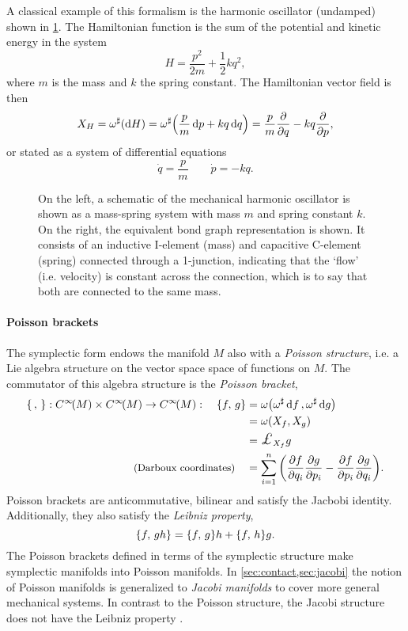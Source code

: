 A classical example of this formalism is the harmonic oscillator (undamped) shown in \cref{fig:ho}. The Hamiltonian function is the sum of the potential and kinetic energy in the system
$$ H = \frac{p^2}{2m} + \frac{1}{2}kq^2,$$
where $m$ is the mass and $k$ the spring constant. The Hamiltonian vector field is then 
$$ X_H = \omega^\sharp\qty(\dd{H}) = \omega^\sharp\qty(\frac{p}{m}\dd{p} + kq\dd{q}) = \frac{p}{m}\pdv{}{q} - kq \pdv{}{p}, $$
or stated as a system of differential equations
$$ \dot{q} = \frac{p}{m} \qquad \dot{p} = -kq. $$
\begin{figure}[ht]
    \centering
    
    \caption{On the left, a schematic of the mechanical harmonic oscillator is shown as a mass-spring system with mass $m$ and spring constant $k$. On the right, the equivalent bond graph representation is shown. It consists of an inductive I-element (mass) and capacitive C-element (spring) connected through a 1-junction, indicating that the `flow' (i.e. velocity) is constant across the connection, which is to say that both are connected to the same mass.}
    \label{fig:ho}
\end{figure}

\paragraph{Poisson brackets} The symplectic form endows the manifold $M$ also with a \emph{Poisson structure}, i.e. a Lie algebra structure on the vector space space of functions on $M$. The commutator of this algebra structure is the \emph{Poisson bracket},
\begin{equation}
    \begin{split}
        \poisson{\,}{}: \functions{M} \times \functions{M} \to \functions{M}: \quad  
        \poisson{f}{g} &= \omega\qty(\fromDual{\omega}\dd{f}, \fromDual{\omega}\dd{g})  \\
                       &= \omega\qty(X_f, X_g) \\
                       &= \lied{X_f}{g} \\
        \text{\small (Darboux coordinates)} \quad &= \sum_{i = 1}^n \qty(\pdv{f}{q_i}\pdv{g}{p_i} - \pdv{f}{p_i}\pdv{g}{q_i}).
    \end{split}
\end{equation}
Poisson brackets are anticommutative, bilinear and satisfy the Jacbobi identity. Additionally, they also satisfy the \emph{Leibniz property}, 
$$ 
    \qty{f,\,gh} = \qty{f,\,g} h + \qty{f,\,h} g. 
$$
The Poisson brackets defined in terms of the symplectic structure make symplectic manifolds into Poisson manifolds. In \cref{sec:contact,sec:jacobi} the notion of Poisson manifolds is generalized to \emph{Jacobi manifolds} to cover more general mechanical systems. In contrast to the Poisson structure, the Jacobi structure does not have the Leibniz property \cite{Arnold1989,Libermann1987}.

